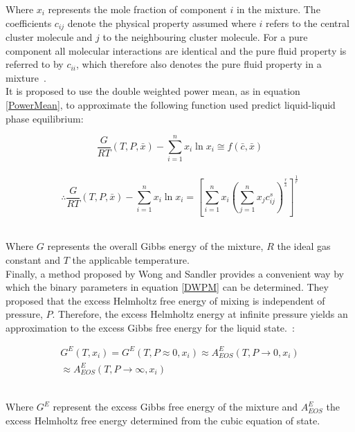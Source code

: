 Where $x_{i}$ represents the mole fraction of component $i$ in the mixture. The coefficients $c_{ij}$ denote the physical property assumed where $i$ refers to the central cluster molecule and $j$ to the neighbouring cluster molecule. For a pure component all molecular interactions are identical and the pure fluid property is referred to by $c_{ii}$, which therefore also denotes the pure fluid property in a mixture~\cite{WeightedPowerMeanModel, FockeSandrock}.\\

It is proposed to use the double weighted power mean, as in equation \ref{PowerMean}, to approximate the following function used predict liquid-liquid phase equilibrium:\

\begin{equation}
  \frac{G}{RT}\left(T, P, \bar{x}\right) - \sum_{i=1}^{n}x_{i}\ln x_{i} \cong f( \bar{c}, \bar{x}) 
\end{equation}\
\begin{equation}
\therefore \frac{G}{RT}\left(T, P, \bar{x}\right) - \sum_{i=1}^{n}x_{i}\ln x_{i} = \left[\sum_{i=1}^{n} x_{i} \left(\sum_{j=1}^{n} x_{j}c_{ij}^{s}\right)^{\frac{r}{s}}\right]^{\frac{1}{r}} \label{DWPM}
\end{equation}\

Where $G$ represents the overall Gibbs energy of the mixture, $R$ the ideal gas constant and $T$ the applicable temperature.\\

Finally, a method proposed by Wong and Sandler provides a convenient way by which the binary parameters in equation \ref{DWPM} can be determined. They proposed that the excess Helmholtz free energy of mixing is independent of pressure, $P$. Therefore, the excess Helmholtz energy at infinite pressure yields an approximation to the excess Gibbs free energy for the liquid state.~\cite{WongSandler, WeightedPowerMeanModel}:\

\begin{eqnarray}
  G^{E}(T, x_{i}) = G^{E}(T, P \approx 0, x_{i}) \approx A_{EOS}^{E}(T, P \rightarrow 0, x_{i})\\
  \approx A_{EOS}^E(T, P \rightarrow \infty, x_{i})
\end{eqnarray} \


Where $G^{E}$ represent the excess Gibbs free energy of the mixture and $A^{E}_{EOS}$ the excess Helmholtz free energy determined from the cubic equation of state.\\

